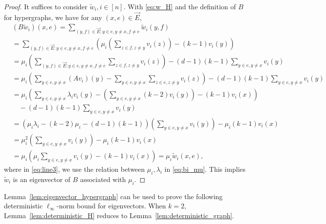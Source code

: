\documentclass[11pt,reqno]{amsart}
\theoremstyle{definition}
\begin{document}
\begin{proof}
   It suffices to consider $\tilde w_i, i\in [n]$. With \eqref{eq:w_H} and the definition of $B$ for hypergraphs, we have for any $(x,e)\in \vec{E}$,
 \begin{align}
    &(B\tilde w_i)(x,e) = \sum_{(y,f)\in \vec{E}:y\in e, y\not=x, f\not=e} \tilde{w}_i(y,f)\\
    &=\sum_{(y,f)\in \vec{E}:y\in e, y\not=x, f\not=e} \left( \mu_i \left(\sum_{z\in f, z\not=y} v_i(z)\right)-(k-1)v_i(y)\right)\\
    &=\mu_i \left(\sum_{(y,f)\in \vec{E}:y\in e, y\not=x, f\not=e} \sum_{z\in f,z\not=y} v_i(z)\right) -(d-1)(k-1) \sum_{y\in e, y\not=x} v_i(y)\\
    &=\mu_i \left( \sum_{y\in e, y\not=x} (Av_i)(y)-\sum_{y\in e, y\not=x}\sum_{z\in e,z\not=y} v_i(z) \right)-(d-1)(k-1) \sum_{y\in e, y\not=x} v_i(y)\\
    &=\mu_i \left( \sum_{y\in e, y\not=x} \lambda_i v_i(y)-\left(\sum_{y\in e, y\not=x}(k-2)v_i(y) \right)-(k-1)v_i(x) \right)\\
    &\quad -(d-1)(k-1) \sum_{y\in e, y\not=x} v_i(y)\\
    &=(\mu_i\lambda_i-(k-2)\mu_i-(d-1)(k-1))\left(\sum_{y\in e, y\not=x} v_i(y)\right)-\mu_i (k-1) v_i(x) \\
    &=\mu_i^2\left(\sum_{y\in e, y\not=x} v_i(y)\right)-\mu_i (k-1) v_i(x) \label{eq:line3}\\
    &=\mu_i \left(\mu_i \sum_{y\in e, y\not=x} v_i(y)-(k-1)v_i(x)\right) =\mu_i \tilde{w}_i(x,e),
\end{align}
where in \eqref{eq:line3}, we use the relation between $\mu_i,\lambda_i$ in \eqref{eq:bi_mu}. This implies  $\tilde{w}_i$ is an eigenvector of $B$ associated with $\mu_i$.
\end{proof}

Lemma~\ref{lem:eigenvector_hypergraph} can be used to prove the following deterministic $\ell_{\infty}$-norm bound for eigenvectors. When $k=2$, Lemma~\ref{lem:deterministic_H} reduces to Lemma~\ref{lem:deterministic_graph}.
\end{document}
